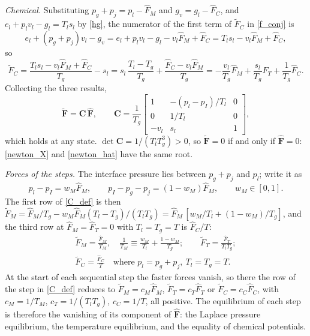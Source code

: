 \emph{Chemical.} Substituting $p_g+p_{j}=p_l-\hat{F}_M$ and $g_v=g_l-\hat{F}_C$, and $e_l+p_lv_l-g_l=T_ls_l$ by \eqref{hg}, the numerator of the first term of $\tilde{F}_C$ in \eqref{f_conj} is
\begin{equation}
e_l+(p_g+p_{j})v_l-g_v=e_l+p_lv_l-g_l-v_l\hat{F}_M+\hat{F}_C=T_ls_l-v_l\hat{F}_M+\hat{F}_C,
\end{equation}
so
\begin{equation}
\tilde{F}_C=\frac{T_ls_l-v_l\hat{F}_M+\hat{F}_C}{T_g}-s_l=s_l\,\frac{T_l-T_g}{T_g}+\frac{\hat{F}_C-v_l\hat{F}_M}{T_g}=-\frac{v_l}{T_g}\hat{F}_M+\frac{s_l}{T_g}\hat{F}_T+\frac1{T_g}\hat{F}_C .
\end{equation}
Collecting the three results,
\begin{equation}\label{C_def}
\tilde{\boldsymbol{F}}=\boldsymbol{C}\,\hat{\boldsymbol{F}},\qquad
\boldsymbol{C}=\frac1{T_g}\begin{bmatrix}1&-(p_l-p_I)/T_l&0\\0&1/T_l&0\\-v_l&s_l&1\end{bmatrix},
\end{equation}
which holds at any state. $\det\boldsymbol{C}=1/(T_lT_g^3)>0$, so $\tilde{\boldsymbol{F}}=0$ if and only if $\hat{\boldsymbol{F}}=0$: \eqref{newton_X} and \eqref{newton_hat} have the same root.

\emph{Forces of the steps.} The interface pressure lies between $p_g+p_{j}$ and $p_l$; write it as
\begin{equation}\label{pI_w}
p_l-p_I=w_M\hat{F}_M,\qquad p_I-p_g-p_{j}=(1-w_M)\hat{F}_M,\qquad w_M\in[0,1].
\end{equation}
The first row of \eqref{C_def} is then $\tilde{F}_M=\hat{F}_M/T_g-w_M\hat{F}_M(T_l-T_g)/(T_lT_g)=\hat{F}_M\,[w_M/T_l+(1-w_M)/T_g]$, and the third row at $\hat{F}_M=\hat{F}_T=0$ with $T_l=T_g=T$ is $\hat{F}_C/T$:
\begin{equation}\label{f_F}
\begin{gathered}
\tilde{F}_M=\frac{\hat{F}_M}{T_M},\quad \frac1{T_M}\equiv\frac{w_M}{T_l}+\frac{1-w_M}{T_g};\qquad
\tilde{F}_T=\frac{\hat{F}_T}{T_lT_g};\\
\tilde{F}_C=\frac{\hat{F}_C}{T}\quad\text{where } p_l=p_g+p_{j},\ T_l=T_g=T.
\end{gathered}
\end{equation}
At the start of each sequential step the faster forces vanish, so there the row of the step in \eqref{C_def} reduces to $\tilde{F}_M=c_M\hat{F}_M$, $\tilde{F}_T=c_T\hat{F}_T$ or $\tilde{F}_C=c_C\hat{F}_C$, with $c_M=1/T_M$, $c_T=1/(T_lT_g)$, $c_C=1/T$, all positive. The equilibrium of each step is therefore the vanishing of its component of $\hat{\boldsymbol{F}}$: the Laplace pressure equilibrium, the temperature equilibrium, and the equality of chemical potentials.

